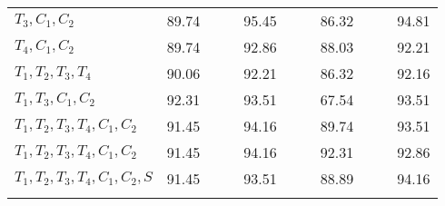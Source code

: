\begin{table}[t]
{\begin{center}
\begin{tabularx}{0.74\textwidth}{@{}l	lllr	 ll	lllr	 @{}}
$T_3,C_1,C_2$				& 89.74 & & & 95.45	& & & 86.32	& & & 94.81\\
$T_4,C_1,C_2$				& 89.74 & & & 92.86	& & & 88.03	& & & 92.21\\
$T_1,T_2,T_3,T_4$			& 90.06	& & & 92.21	& & & 86.32	& & & 92.16\\
$T_1,T_3,C_1,C_2$			& \cellcolor[gray]{0.8}92.31	&\cellcolor[gray]{0.8} &\cellcolor[gray]{0.8} & \cellcolor[gray]{0.8}93.51	& & & 67.54	& & & 93.51\\
$T_1,T_2,T_3,T_4,C_1,C_2$	& 91.45	& & & 94.16	& & & 89.74	& & & 93.51\\
$T_1,T_2,T_3,T_4,C_1,C_2 $  & 91.45	& & & 94.16	& & & \cellcolor[gray]{0.8}92.31 &\cellcolor[gray]{0.8} &\cellcolor[gray]{0.8} & \cellcolor[gray]{0.8}92.86\\
$T_1,T_2,T_3,T_4,C_1,C_2,S$ & 91.45	& & & 93.51	& & & 88.89	& & & 94.16\\	
 	\multicolumn{11}{l}{}\\
 	\bottomrule
  \end{tabularx}  
  \end{center}
	}
	
\end{table}
	



	




	


























	
















